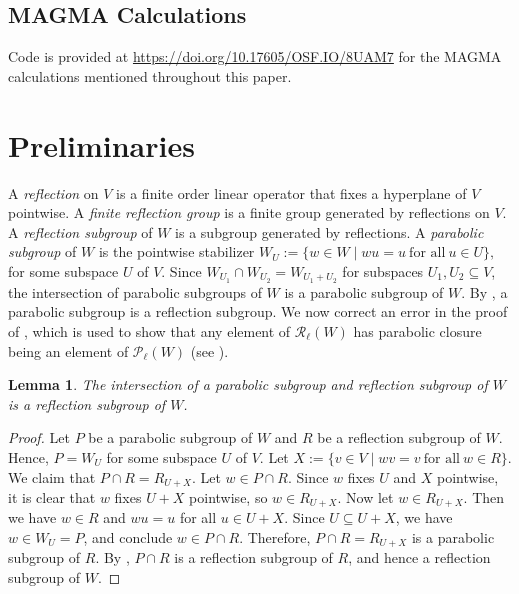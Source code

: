 \documentclass[12pt]{amsart}
\theoremstyle{plain}
\newtheorem{lemma}[theorem]{Lemma}
\theoremstyle{definition}
\numberwithin{equation}{section}
\numberwithin{equation}{section}
\begin{document}
	\subsection*{MAGMA Calculations} Code is provided at \url{https://doi.org/10.17605/OSF.IO/8UAM7} for the MAGMA calculations mentioned throughout this paper.
	
	\section{Preliminaries}\label{Preliminaries}
	
	A \emph{reflection} on $V$ is a finite order linear operator that fixes a hyperplane of $V$ pointwise. A \emph{finite reflection group} is a finite group generated by reflections on $V$. A \emph{reflection subgroup} of $W$ is a subgroup generated by reflections. A \emph{parabolic subgroup} of $W$ is the pointwise stabilizer $W_U:=\{w\in W \mid wu=u \ \text{for all} \ u\in U\},$ for some subspace $U$ of $V$. Since $W_{U_1}\cap W_{U_2}=W_{U_1+U_2}$ for subspaces $U_1,U_2\subseteq V$, the intersection of parabolic subgroups of $W$ is a parabolic subgroup of $W$. By \cite[Theorem 1.5]{STEINBERG}, a parabolic subgroup is a reflection subgroup. We now correct an error in the proof of \cite[Lemma 2.3]{ME}, which is used to show that any element of $\mathcal{R}_\ell(W)$ has parabolic closure being an element of $\mathcal{P}_\ell(W)$ (see \cite[Corollary 2.5]{ME}).
	
	\begin{lemma}\label{lem:intersectionpararef}
		The intersection of a parabolic subgroup and reflection subgroup of $W$ is a reflection subgroup of $W$.
	\end{lemma}
	
	\begin{proof}
		Let $P$ be a parabolic subgroup of $W$ and $R$ be a reflection subgroup of $W$. Hence, $P=W_U$ for some subspace $U$ of $V$. Let $X:=\{v\in V \mid wv=v \ \text{for all} \ w\in R\}$. We claim that $P\cap R=R_{U+X}$. Let $w\in P\cap R$. Since $w$ fixes $U$ and $X$ pointwise, it is clear that $w$ fixes $U+X$ pointwise, so $w\in R_{U+X}$. Now let $w\in R_{U+X}$. Then we have $w\in R$ and $wu=u$ for all $u\in U+X$. Since $U\subseteq U+X$, we have $w\in W_U=P$, and conclude $w\in P\cap R$. Therefore, $P\cap R=R_{U+X}$ is a parabolic subgroup of $R$. By \cite[Theorem 1.5]{STEINBERG}, $P\cap R$ is a reflection subgroup of $R$, and hence a reflection subgroup of $W$. 
	\end{proof}
	
\end{document}
